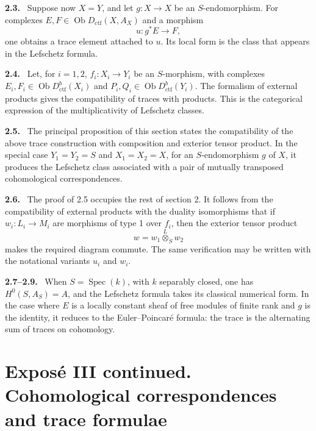 \documentclass[11pt]{article}
\theoremstyle{plain}
\theoremstyle{definition}
\theoremstyle{remark}
\newenvironment{statement}[1]{\par\medskip\noindent\textbf{#1.}\ }{\par\medskip}
\DeclareMathOperator{\Spec}{Spec}
\DeclareMathOperator{\ob}{Ob}
\begin{document}
\begin{statement}{2.3}
Suppose now $X=Y$, and let $g:X\to X$ be an $S$-endomorphism. For complexes $E,F\in\ob D_{\mathrm{ctf}}(X,A_X)$ and a morphism
\[
   u:g^*E\longrightarrow F,
\]
one obtains a trace element attached to $u$. Its local form is the class that appears in the Lefschetz formula.
\end{statement}

\begin{statement}{2.4}
Let, for $i=1,2$, $f_i:X_i\to Y_i$ be an $S$-morphism, with complexes $E_i,F_i\in\ob D^b_{\mathrm{ctf}}(X_i)$ and $P_i,Q_i\in\ob D^b_{\mathrm{ctf}}(Y_i)$. The formalism of external products gives the compatibility of traces with products. This is the categorical expression of the multiplicativity of Lefschetz classes.
\end{statement}

\begin{statement}{2.5}
The principal proposition of this section states the compatibility of the above trace construction with composition and exterior tensor product. In the special case $Y_1=Y_2=S$ and $X_1=X_2=X$, for an $S$-endomorphism $g$ of $X$, it produces the Lefschetz class associated with a pair of mutually transposed cohomological correspondences.
\end{statement}

\begin{statement}{2.6}
The proof of 2.5 occupies the rest of section 2. It follows from the compatibility of external products with the duality isomorphisms that if $w_i:L_i\to M_i$ are morphisms of type 1 over $f_i$, then the exterior tensor product
\[
   w=w_1\overset L\otimes_S w_2
\]
makes the required diagram commute. The same verification may be written with the notational variants $u_i$ and $w_i$.
\end{statement}

\begin{statement}{2.7--2.9}
When $S=\Spec(k)$, with $k$ separably closed, one has $H^0(S,A_S)=A$, and the Lefschetz formula takes its classical numerical form. In the case where $E$ is a locally constant sheaf of free modules of finite rank and $g$ is the identity, it reduces to the Euler--Poincaré formula: the trace is the alternating sum of traces on cohomology.
\end{statement}

\section*{Exposé III continued. Cohomological correspondences and trace formulae}
\end{document}
